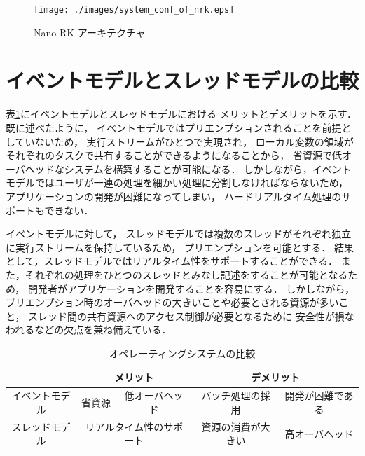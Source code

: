 \begin{figure}[htbp]
 \begin{center}
  \texttt{[image: ./images/system\_conf\_of\_nrk.eps]}
 \end{center}
 \caption{Nano-RK アーキテクチャ}
 \label{fig:system_conf_of_nrk}
\end{figure}






\section{イベントモデルとスレッドモデルの比較}\label{sec:comparison_between_event_and_threads}
表\ref{tab:merit_and_demerit}にイベントモデルとスレッドモデルにおける
メリットとデメリットを示す．
既に述べたように，
イベントモデルではプリエンプションされることを前提としていないため，
実行ストリームがひとつで実現され，
ローカル変数の領域がそれぞれのタスクで共有することができるようになることから，
省資源で低オーバヘッドなシステムを構築することが可能になる．
しかしながら，イベントモデルではユーザが一連の処理を細かい処理に分割しなければならないため，
アプリケーションの開発が困難になってしまい，
ハードリアルタイム処理のサポートもできない．


イベントモデルに対して，
スレッドモデルでは複数のスレッドがそれぞれ独立に実行ストリームを保持しているため，
プリエンプションを可能とする．
結果として，スレッドモデルではリアルタイム性をサポートすることができる．
また，それぞれの処理をひとつのスレッドとみなし記述をすることが可能となるため，
開発者がアプリケーションを開発することを容易にする．
しかしながら，プリエンプション時のオーバヘッドの大きいことや必要とされる資源が多いこと，
スレッド間の共有資源へのアクセス制御が必要となるために
安全性が損なわれるなどの欠点を兼ね備えている．


%



\begin{table}[htb]
  \centering
  \caption{オペレーティングシステムの比較}
  \begin{tabular}{|c||c|c|c|c|} \hline
    \backslashbox{}{} & \multicolumn{2}{|c|}{メリット} & \multicolumn{2}{|c|}{デメリット} \\ \hline \hline
    イベントモデル & 省資源 & 低オーバヘッド & バッチ処理の採用 & 開発が困難である \\ \hline
    スレッドモデル & \multicolumn{2}{|c|}{リアルタイム性のサポート} & 資源の消費が大きい & 高オーバヘッド \\ \hline
  \end{tabular}
  \label{tab:merit_and_demerit}
\end{table}





